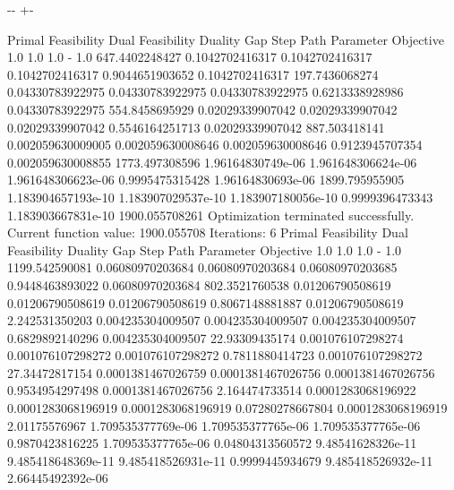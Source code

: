 \documentclass[letterpaper,10pt,english]{sphinxmanual}
\newlength\nbsphinxcodecellspacing
\begin{document}
{

\kern-\sphinxverbatimsmallskipamount\kern-\baselineskip
\kern+\FrameHeightAdjust\kern-\fboxrule
\vspace{\nbsphinxcodecellspacing}

\begin{sphinxVerbatim}[commandchars=\\\{\}]
Primal Feasibility  Dual Feasibility    Duality Gap         Step             Path Parameter      Objective
1.0                 1.0                 1.0                 -                1.0                 647.4402248427
0.1042702416317     0.1042702416317     0.1042702416317     0.9044651903652  0.1042702416317     197.7436068274
0.04330783922975    0.04330783922975    0.04330783922975    0.6213338928986  0.04330783922975    554.8458695929
0.02029339907042    0.02029339907042    0.02029339907042    0.5546164251713  0.02029339907042    887.503418141
0.002059630009005   0.002059630008646   0.002059630008646   0.9123945707354  0.002059630008855   1773.497308596
1.96164830749e-06   1.961648306624e-06  1.961648306623e-06  0.9995475315428  1.96164830693e-06   1899.795955905
1.183904657193e-10  1.183907029537e-10  1.183907180056e-10  0.9999396473343  1.183903667831e-10  1900.055708261
Optimization terminated successfully.
         Current function value: 1900.055708
         Iterations: 6
Primal Feasibility  Dual Feasibility    Duality Gap         Step             Path Parameter      Objective
1.0                 1.0                 1.0                 -                1.0                 1199.542590081
0.06080970203684    0.06080970203684    0.06080970203685    0.9448463893022  0.06080970203684    802.3521760538
0.01206790508619    0.01206790508619    0.01206790508619    0.8067148881887  0.01206790508619    2.242531350203
0.004235304009507   0.004235304009507   0.004235304009507   0.6829892140296  0.004235304009507   22.93309435174
0.001076107298274   0.001076107298272   0.001076107298272   0.7811880414723  0.001076107298272   27.34472817154
0.0001381467026759  0.0001381467026756  0.0001381467026756  0.9534954297498  0.0001381467026756  2.164474733514
0.0001283068196922  0.0001283068196919  0.0001283068196919  0.07280278667804 0.0001283068196919  2.01175576967
1.709535377769e-06  1.709535377765e-06  1.709535377765e-06  0.9870423816225  1.709535377765e-06  0.04804313560572
9.48541628326e-11   9.485418648369e-11  9.485418526931e-11  0.9999445934679  9.485418526932e-11  2.66445492392e-06

\end{sphinxVerbatim}}
\end{document}
